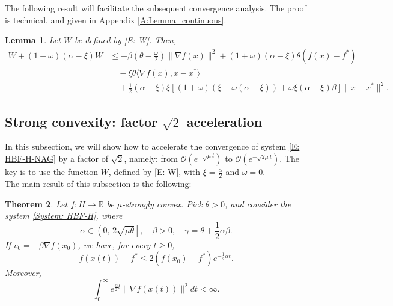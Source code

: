 \documentclass[pdflatex,sn-mathphys-num]{sn-jnl}
\theoremstyle{thmstyleone}
\newtheorem{theorem}{Theorem}
\newtheorem{lemma}[theorem]{Lemma}
\theoremstyle{thmstyletwo}
\theoremstyle{thmstylethree}
\begin{document}
The following result will facilitate the subsequent convergence analysis. The proof is technical, and given in Appendix \ref{A:Lemma_continuous}.


\begin{lemma}\label{Lem: W_bound}
Let $W$ be defined by \eqref{E: W}. Then,
\begin{align*}
\dot{W} + (1+\omega)(\alpha-\xi)W &\le - \beta\left( \theta - \frac{\omega}{2} \right)\|\nabla f(x)\|^2 
  + (1+\omega)(\alpha-\xi)\theta (f(x)-f^*)\\
&\quad 
  - \xi\theta \langle\nabla f(x),x-x^* \rangle \\
&\quad + \frac{1}{2}(\alpha-\xi)\xi[ (1+\omega)(\xi-\omega(\alpha-\xi))  + \omega\xi(\alpha-\xi)\beta ]\|x-x^*\|^2.
\end{align*}
\end{lemma}




\subsection{ Strong convexity: factor \texorpdfstring{$\sqrt{2}$}{} acceleration }\label{SS:factorsqrt2}
In this subsection, we will show how to accelerate the convergence of system \eqref{E: HBF-H-NAG} by a factor of $\sqrt{2}$, namely: from $\mathcal{O}\left( e^{-\sqrt{\mu}t} \right)$ to $\mathcal{O}\left( e^{-\sqrt{2\mu}t} \right)$. The key is to use the function $W$, defined by \eqref{E: W}, with $\xi=\frac{\alpha}{2}$ and $\omega=0$. \\

The main result of this subsection is the following:


\begin{theorem}
Let $f:H\to\mathbb{R}$ be $\mu$-strongly convex. Pick $\theta>0$, and consider the system \eqref{System: HBF-H}, where
$$\alpha\in \left(0,\, 2\sqrt{\mu\theta}\right],\quad \beta > 0,\quad \gamma = \theta + \frac{1}{2}\alpha\beta.$$
If $v_0 = -\beta\nabla f(x_0)$, we have, for every $t\ge 0$,
$$f\left( x(t) \right) - f^* \le 2 \left( f(x_0) - f^* \right) e^{-\frac{1}{2}\alpha t}.$$
Moreover, 
$$ \int_0^{\infty} e^{\frac{\alpha}{2}t}\| \nabla f\left(x(t)\right) \|^2 dt < \infty. $$
\end{theorem}
\end{document}
